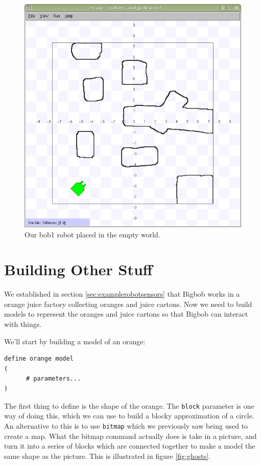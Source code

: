 \documentclass[a4paper]{report}
\begin{document}
\begin{figure}
	\centering
	\includegraphics[width=0.7\linewidth]{./pics/robot_building/final_robot_build.png} 
	\caption{Our bob1 robot placed in the empty world.}
	\label{fig:finalRobotBuild}
\end{figure}


\section{Building Other Stuff} \label{sec:otherStuff}
We established in section \ref{sec:examplerobotsensors} that Bigbob works in a orange juice factory collecting oranges and juice cartons. Now we need to build models to represent the oranges and juice cartons so that Bigbob can interact with things.

We'll start by building a model of an orange:
\begin{verbatim}
define orange model
(
      # parameters...
)
\end{verbatim}
The first thing to define is the shape of the orange. The \verb|block| parameter is one way of doing this, which we can use to build a blocky approximation of a circle. An alternative to this is to use \verb|bitmap| which we previously saw being used to create a map. What the bitmap command actually does is take in a picture, and turn it into a series of blocks which are connected together to make a model the same shape as the picture. This is illustrated in figure \ref{fig:ghosts}. 
\end{document}
